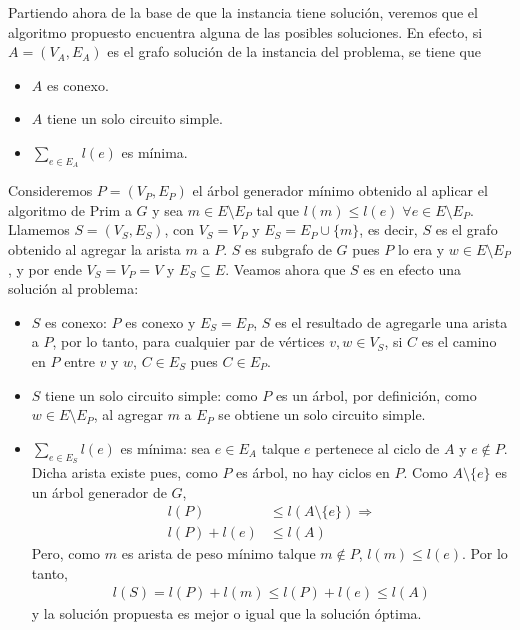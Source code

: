 Partiendo ahora de la base de que la instancia tiene solución, veremos
que el algoritmo propuesto encuentra alguna de las posibles soluciones. En
efecto, si $A = (V_A, E_A)$ es el grafo solución de la instancia del
problema, se tiene que

\begin{itemize}
  \item $A$ es conexo.

  \item $A$ tiene un solo circuito simple.

  \item $\sum\limits_{e \in E_A} l(e)$ es mínima.
\end{itemize}

Consideremos $P = (V_P, E_P)$ el árbol generador mínimo obtenido al aplicar
el algoritmo de Prim a $G$ y sea $m \in E \setminus E_P$ tal que $l(m) \leq
l(e) \; \forall e \in E \setminus E_P$. Llamemos $S = (V_S, E_S)$, con $V_S
= V_P$ y $E_S = E_P \cup \{m\}$, es decir, $S$ es el grafo obtenido al
agregar la arista $m$ a $P$. $S$ es subgrafo de $G$ pues $P$ lo era y $w \in
E \setminus E_P$, y por ende $V_S = V_P = V$ y $E_S \subseteq E$. Veamos
ahora que $S$ es en efecto una solución al problema:

\begin{itemize}
  \item $S$ es conexo: $P$ es conexo y $E_S = E_P$, $S$ es el resultado de
  agregarle una arista a $P$, por lo tanto, para cualquier par de vértices
  $v, w \in V_S$, si $C$ es el camino en $P$ entre $v$ y $w$, $C \in E_S$
  pues $C \in E_P$.
  \item $S$ tiene un solo circuito simple: como $P$ es un árbol, por
  definición, como $w \in E \setminus E_P$, al agregar $m$ a $E_P$ se
  obtiene un solo circuito simple.
  \item $\sum\limits_{e \in E_S} l(e)$ es mínima: sea $e \in E_A$ talque $e$
  pertenece al ciclo de $A$ y $e \notin P$. Dicha arista existe pues, como
  $P$ es árbol, no hay ciclos en $P$. Como $A \setminus \{e\}$ es un árbol
  generador de $G$,
  \begin{align*}
    l(P) &\leq l(A \setminus \{e\}) \Rightarrow \\
    l(P) + l(e) &\leq l(A)
  \end{align*}
  Pero, como $m$ es arista de peso mínimo talque $m \notin P$, $l(m) \leq
  l(e)$. Por lo tanto,
  \begin{align*}
    l(S) = l(P) + l(m) \leq l(P) + l(e) \leq l(A)
  \end{align*}
  y la solución propuesta es mejor o igual que la solución óptima.

\end{itemize}

